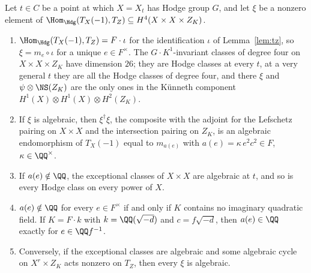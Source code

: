 \begin{theorem}\label{thm:link}
Let $t\in C$ be a point at which $X=X_{t}$ has Hodge group $G$, and let $\xi$ be a nonzero element of $\Hom_{\Hdg}(T_{X}(-1),T_{Z})\subseteq H^{4}(X\times X\times Z_{K})$.
\begin{enumerate}[label=\textup{(\roman*)},leftmargin=2.4em,itemsep=2pt]
\item $\Hom_{\Hdg}(T_{X}(-1),T_{Z})=F\cdot\iota$ for the identification $\iota$ of Lemma~\ref{lem:tz}, so $\xi=m_{e}\circ\iota$ for a unique $e\in F^{\times}$. The $G\cdot K^{1}$-invariant classes of degree four on $X\times X\times Z_{K}$ have dimension $26$; they are Hodge classes at every $t$, at a very general $t$ they are all the Hodge classes of degree four, and there $\xi$ and $\psi\otimes\NS(Z_{K})$ are the only ones in the K\"unneth component $H^{1}(X)\otimes H^{1}(X)\otimes H^{2}(Z_{K})$.
\item If $\xi$ is algebraic, then $\xi^{\dagger}\xi$, the composite with the adjoint for the Lefschetz pairing on $X\times X$ and the intersection pairing on $Z_{K}$, is an algebraic endomorphism of $T_{X}(-1)$ equal to $m_{a(e)}$ with $a(e)=\kappa\,e^{2}c^{2}\in F$, $\kappa\in\QQ^{\times}$.
\item If $a(e)\notin\QQ$, the exceptional classes of $X\times X$ are algebraic at $t$, and so is every Hodge class on every power of $X$.
\item $a(e)\notin\QQ$ for every $e\in F^{\times}$ if and only if $K$ contains no imaginary quadratic field. If $K=F\cdot k$ with $k=\QQ(\sqrt{-d})$ and $c=f\sqrt{-d}$, then $a(e)\in\QQ$ exactly for $e\in\QQ f^{-1}$.
\item Conversely, if the exceptional classes are algebraic and some algebraic cycle on $X^{r}\times Z_{K}$ acts nonzero on $T_{Z}$, then every $\xi$ is algebraic.
\end{enumerate}
\end{theorem}

